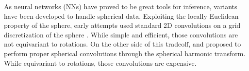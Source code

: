 \documentclass{article} %
\begin{document}


As neural networks (NNs) have proved to be great tools for inference, variants have been developed to handle spherical data.
Exploiting the locally Euclidean property of the sphere, early attempts used standard 2D convolutions on a grid discretization of the sphere \citep{boomsma2017sphericalcnn, su2017sphericalcnn, coors2018sphericalcnn}.
While simple and efficient, those convolutions are not equivariant to rotations.
On the other side of this tradeoff, \citet{cohen2018sphericalcnn} and \citet{esteves2018sphericalcnn} proposed to perform proper spherical convolutions through the spherical harmonic transform.
While equivariant to rotations, those convolutions are expensive.

\end{document}
